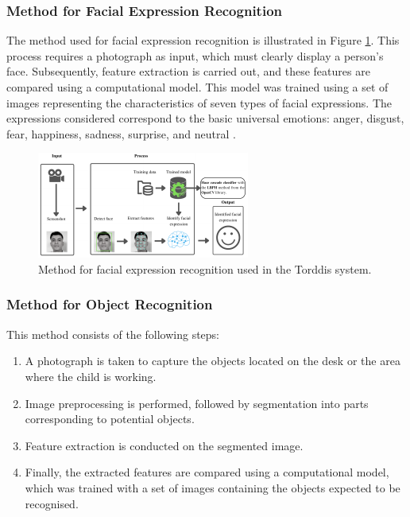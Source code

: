 \documentclass[a4paper,fleqn]{cas-sc}
\begin{document}
			\subsubsection{Method for Facial Expression Recognition}
				The method used for facial expression recognition is illustrated in Figure \ref{fig:FacialExpression}. This process requires a photograph as input, which must clearly display a person's face. Subsequently, feature extraction is carried out, and these features are compared using a computational model. This model was trained using a set of images representing the characteristics of seven types of facial expressions. The expressions considered correspond to the basic universal emotions: anger, disgust, fear, happiness, sadness, surprise, and neutral \citep{Zhang2022}.
				
				\begin{figure}[hbt!]
					\centering
					\includegraphics[frame,scale=0.5, width=\linewidth]{figs/Figure_2}
					\caption{Method for facial expression recognition used in the Torddis system.\label{fig:FacialExpression}}
				\end{figure} 
				
			\subsubsection{Method for Object Recognition}
				This method consists of the following steps:
				\begin{enumerate}
					\item A photograph is taken to capture the objects located on the desk or the area where the child is working.
					\item Image preprocessing is performed, followed by segmentation into parts corresponding to potential objects.
					\item Feature extraction is conducted on the segmented image.
					\item Finally, the extracted features are compared using a computational model, which was trained with a set of images containing the objects expected to be recognised. 
				\end{enumerate}
\end{document}
